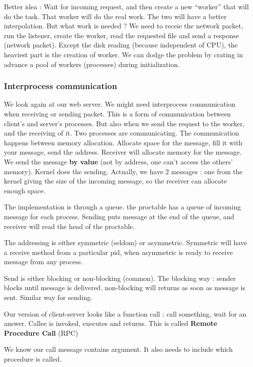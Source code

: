 \documentclass[12pt,a4paper]{article}
\begin{document}
Better idea : Wait for incoming request, and then create a new ``worker'' that will do the task. That worker will do the real work. The two will have a better interpolation. But what work is needed ? We need to receie the network packet, run the listener, create the worker, read the requested file and send a response (network packet). Except the disk reading (because independent of CPU), the heaviest part is the creation of worker. We can dodge the problem by crating in advance a pool of workers (processes) during initialization. 

\subsubsection{Interprocess communication}
We look again at our web server. We might need interprocess communication when receiving or sending packet. This is a form of communication between client's and server's processes. But also when we send the request to the worker, and the receiving of it. Two processes are communicating. The communication happens between memory allocation. Allocate space for the message, fill it with your message, send the address. Receiver will allocate memory for the message. We send the message \textbf{by value} (not by address, one can't access the others' memory). Kernel does the sending. Actually, we have 2 messages : one from the kernel giving the size of the incoming message, so the receiver can allocate enough space. 

The implementation is through a queue. the proctable has a queue of incoming message for each process. Sending puts message at the end of the queue, and receiver will read the head of the proctable. 

The addressing is either symmetric (seldom) or asymmetric. Symmetric will have a receive method from a particular pid, when asymmetric is ready to receive message from any process. 

Send is either blocking or non-blocking (common). The blocking way : sender blocks until message is delivered. non-blocking will returns as soon as message is sent. Similar way for sending. 

Our version of client-server looks like a function call : call something, wait for an answer. Callee is invoked, executes and returns. This is called \textbf{Remote Procedure Call} (RPC)


We know our call message contains argument. It also needs to include which procedure is called.
\end{document}
